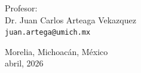 \begin{titlepage}
\begin{center}
\begin{center}
\bigskip

Profesor: \\
Dr. Juan Carlos Arteaga Vekazquez\\
\texttt{juan.artega@umich.mx}
\end{center}

\vfill

\begin{center}
{Morelia, Michoacán, México}\\
{abril, 2026}
\end{center}
\cleardoublepage
\end{center}
\end{titlepage}
